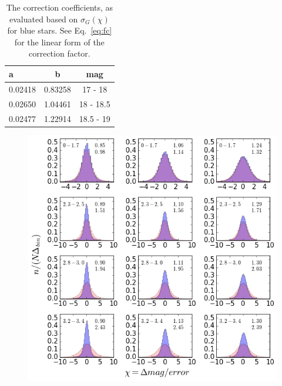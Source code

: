 \documentclass[fleqn,usenatbib]{mnras}  %
\begin{document}
\begin{table}

\caption{The correction coefficients, as evaluated based on $\sigma_{G}(\chi)$ for blue stars. See Eq.~\ref{eq:fc} for the linear form of the correction factor.}
\label{tab:fc}
\begin{tabular}{ l|cc } 
a  & b & mag \\ 
 \hline
0.02418  &  0.83258 &  17   - 18  \\
0.02650  &  1.04461 &  18   - 18.5  \\
0.02477  &  1.22914 &  18.5 - 19  
\end{tabular}
\end{table}


\begin{figure}
\label{fig:3}
\includegraphics[width=1.1\columnwidth]{Fig_3_histogram_panels.png}

\end{figure}
\end{document}
